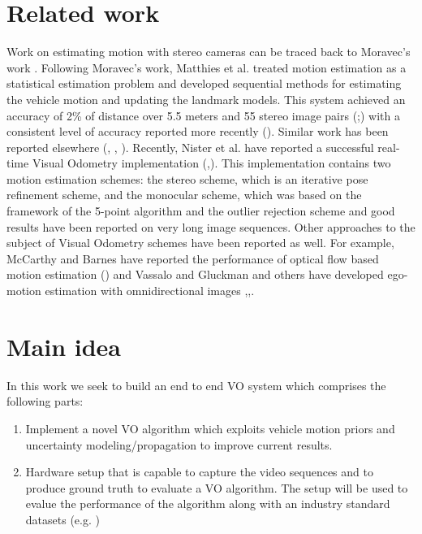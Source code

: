 \documentclass[10pt]{article}         %
\begin{document}
\section{Related work}\label{sect:related}
Work on estimating motion with stereo cameras can be traced back to Moravec's work \cite{Moravec:1980:OAN:909315}. Following Moravec's work, Matthies et al. treated motion estimation as a statistical estimation problem and developed sequential methods for estimating the vehicle motion and updating the landmark models. This system achieved an accuracy of 2\% of distance over 5.5 meters and 55 stereo image pairs (\cite{Matthies87errormodeling};\cite{Matthies:1989:DSV:916891}) with a consistent level of accuracy reported more recently (\cite{olson2003rover}). Similar work has been reported elsewhere (\cite{zhang1988analysis}, \cite{lacroix1999rover}, \cite{nister2004visual}). Recently, Nister et al. have reported a successful real-time Visual Odometry implementation (\cite{nister2006visual},\cite{nister2004efficient}). This implementation contains two motion estimation schemes: the stereo scheme, which is an iterative pose refinement scheme, and the monocular scheme, which was based on the framework of the 5-point algorithm \cite{nister2004efficient} and the outlier rejection scheme \cite{nister2005preemptive} and good results have been reported on very long image sequences. Other approaches to the subject of Visual Odometry schemes have been reported as well.  For example, McCarthy and Barnes have reported the performance of optical flow based motion estimation (\cite{mccarthy2004performance}) and Vassalo and Gluckman and others have developed ego-motion estimation with omnidirectional images \cite{vassallo2002general},\cite{gluckman1998ego},\cite{corke2004omnidirectional}.

\section{Main idea}\label{sect:main_idea}
In this work we seek to build an end to end VO system which comprises the following parts:
\begin{enumerate}
\item Implement a novel VO algorithm which exploits vehicle motion priors and uncertainty modeling/propagation to improve current results.
\item Hardware setup that is capable to capture the video sequences and to produce ground truth to evaluate a VO algorithm.  The setup will be used to evalue the performance of the algorithm along with an industry standard datasets (e.g. \cite{Geiger2012CVPR})
\end{enumerate}
\end{document}
